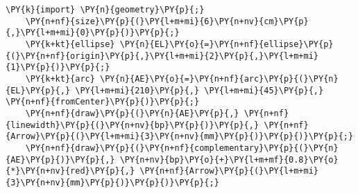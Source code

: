\begin{Verbatim}[commandchars=\\\{\}]
    \PY{k}{import} \PY{n}{geometry}\PY{p}{;}
    \PY{n+nf}{size}\PY{p}{(}\PY{l+m+mi}{6}\PY{n+nv}{cm}\PY{p}{,}\PY{l+m+mi}{0}\PY{p}{)}\PY{p}{;}
    \PY{k+kt}{ellipse} \PY{n}{EL}\PY{o}{=}\PY{n+nf}{ellipse}\PY{p}{(}\PY{n+nf}{origin}\PY{p}{,}\PY{l+m+mi}{2}\PY{p}{,}\PY{l+m+mi}{1}\PY{p}{)}\PY{p}{;}
    \PY{k+kt}{arc} \PY{n}{AE}\PY{o}{=}\PY{n+nf}{arc}\PY{p}{(}\PY{n}{EL}\PY{p}{,} \PY{l+m+mi}{210}\PY{p}{,} \PY{l+m+mi}{45}\PY{p}{,} \PY{n+nf}{fromCenter}\PY{p}{)}\PY{p}{;}
    \PY{n+nf}{draw}\PY{p}{(}\PY{n}{AE}\PY{p}{,} \PY{n+nf}{linewidth}\PY{p}{(}\PY{n+nv}{bp}\PY{p}{)}\PY{p}{,} \PY{n+nf}{Arrow}\PY{p}{(}\PY{l+m+mi}{3}\PY{n+nv}{mm}\PY{p}{)}\PY{p}{)}\PY{p}{;}
    \PY{n+nf}{draw}\PY{p}{(}\PY{n+nf}{complementary}\PY{p}{(}\PY{n}{AE}\PY{p}{)}\PY{p}{,} \PY{n+nv}{bp}\PY{o}{+}\PY{l+m+mf}{0.8}\PY{o}{*}\PY{n+nv}{red}\PY{p}{,} \PY{n+nf}{Arrow}\PY{p}{(}\PY{l+m+mi}{3}\PY{n+nv}{mm}\PY{p}{)}\PY{p}{)}\PY{p}{;}
\end{Verbatim}
